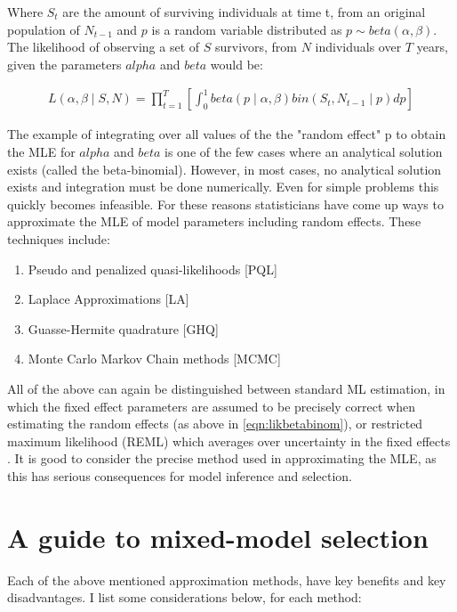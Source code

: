 \documentclass{article}\usepackage[]{graphicx}\usepackage[]{color}
\numberwithin{equation}{section} %
\numberwithin{figure}{section} %
\numberwithin{table}{section} %
\begin{document}
Where $S_t$ are the amount of surviving individuals at time t, from an original population of $N_{t-1}$ and $p$ is a random variable distributed as $p \sim beta(\alpha,\beta)$. The likelihood of observing a set of $S$ survivors, from $N$ individuals over $T$ years, given the parameters $alpha$ and $beta$ would be: 

\begin{equation}
\begin{split}
L(\alpha,\beta \mid S,N) = \prod^{T}_{t=1} \left[ \int^{1}_{0} beta(p \mid \alpha,\beta) bin(S_t,N_{t-1} \mid p) dp \right]  \label{eqn:likbetabinom}
\end{split}
\end{equation}

The example of integrating over all values of the the "random effect" p to obtain the MLE for $alpha$ and $beta$ is one of the few cases where an analytical solution exists (called the beta-binomial). However, in most cases, no analytical solution exists and integration must be done numerically. Even for simple problems this quickly becomes infeasible. For these reasons statisticians have come up ways to approximate the MLE of model parameters including random effects. These techniques include:

\begin{enumerate}
\item Pseudo and penalized quasi-likelihoods [PQL]
\item Laplace Approximations [LA]
\item Guasse-Hermite quadrature [GHQ]
\item Monte Carlo Markov Chain methods [MCMC]
\end{enumerate}

All of the above can again be distinguished between standard ML estimation, in which the fixed effect parameters are assumed to be precisely correct when estimating the random effects (as above in \ref{eqn:likbetabinom}), or restricted maximum likelihood (REML) which averages over uncertainty in the fixed effects \citep{Pinheiro2000}. It is good to consider the precise method used in approximating the MLE, as this has serious consequences for model inference and selection.

\section{A guide to mixed-model selection}

Each of the above mentioned approximation methods, have key benefits and key disadvantages. I list some considerations below, for each method:
\end{document}
